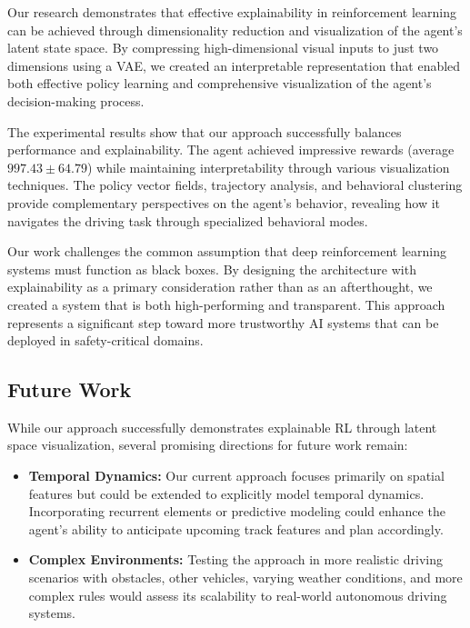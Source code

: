 \documentclass[conference]{IEEEtran}
\begin{document}
Our research demonstrates that effective explainability in reinforcement learning can be achieved through dimensionality reduction and visualization of the agent's latent state space. By compressing high-dimensional visual inputs to just two dimensions using a VAE, we created an interpretable representation that enabled both effective policy learning and comprehensive visualization of the agent's decision-making process.

The experimental results show that our approach successfully balances performance and explainability. The agent achieved impressive rewards (average $997.43 \pm 64.79$) while maintaining interpretability through various visualization techniques. The policy vector fields, trajectory analysis, and behavioral clustering provide complementary perspectives on the agent's behavior, revealing how it navigates the driving task through specialized behavioral modes.

Our work challenges the common assumption that deep reinforcement learning systems must function as black boxes. By designing the architecture with explainability as a primary consideration rather than as an afterthought, we created a system that is both high-performing and transparent. This approach represents a significant step toward more trustworthy AI systems that can be deployed in safety-critical domains.

\subsection{Future Work}

While our approach successfully demonstrates explainable RL through latent space visualization, several promising directions for future work remain:

\begin{itemize}
    \item \textbf{Temporal Dynamics:} Our current approach focuses primarily on spatial features but could be extended to explicitly model temporal dynamics. Incorporating recurrent elements or predictive modeling could enhance the agent's ability to anticipate upcoming track features and plan accordingly.
    
    \item \textbf{Complex Environments:} Testing the approach in more realistic driving scenarios with obstacles, other vehicles, varying weather conditions, and more complex rules would assess its scalability to real-world autonomous driving systems.
\end{itemize}
\end{document}

